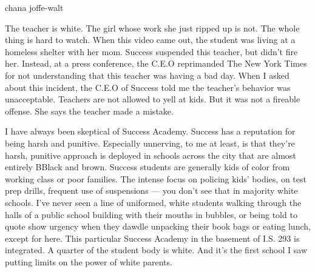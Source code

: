 chana joffe-walt

The teacher is white. The girl whose work she just ripped up is not. The
whole thing is hard to watch. When this video came out, the student was
living at a homeless shelter with her mom. Success suspended this
teacher, but didn't fire her. Instead, at a press conference, the C.E.O
reprimanded The New York Times for not understanding that this teacher
was having a bad day. When I asked about this incident, the C.E.O of
Success told me the teacher's behavior was unacceptable. Teachers are
not allowed to yell at kids. But it was not a fireable offense. She says
the teacher made a mistake.

I have always been skeptical of Success Academy. Success has a
reputation for being harsh and punitive. Especially unnerving, to me at
least, is that they're harsh, punitive approach is deployed in schools
across the city that are almost entirely BBlack and brown. Success
students are generally kids of color from working class or poor
families. The intense focus on policing kids' bodies, on test prep
drills, frequent use of suspensions --- you don't see that in majority
white schools. I've never seen a line of uniformed, white students
walking through the halls of a public school building with their mouths
in bubbles, or being told to quote show urgency when they dawdle
unpacking their book bags or eating lunch, except for here. This
particular Success Academy in the basement of I.S. 293 is integrated. A
quarter of the student body is white. And it's the first school I saw
putting limits on the power of white parents.


